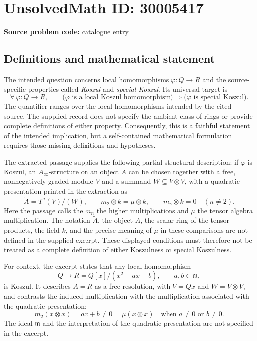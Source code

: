 \documentclass[11pt]{article}
\begin{document}
\section*{UnsolvedMath ID: 30005417}
\textbf{Source problem code:} catalogue entry
\subsection{Definitions and mathematical statement}
The intended question concerns local homomorphisms \(\varphi\colon Q\to R\) and the source-specific properties called \emph{Koszul} and \emph{special Koszul}. Its universal target is
\[
\forall\,\varphi\colon Q\to R,\qquad
\bigl(\varphi\text{ is a local Koszul homomorphism}\bigr)
\Longrightarrow
\bigl(\varphi\text{ is special Koszul}\bigr).
\]
The quantifier ranges over the local homomorphisms intended by the cited source. The supplied record does not specify the ambient class of rings or provide complete definitions of either property. Consequently, this is a faithful statement of the intended implication, but a self-contained mathematical formulation requires those missing definitions and hypotheses.

The extracted passage supplies the following partial structural description: if \(\varphi\) is Koszul, an \(A_\infty\)-structure on an object \(A\) can be chosen together with a free, nonnegatively graded module \(V\) and a summand \(W\subseteq V\otimes V\), with a quadratic presentation printed in the extraction as
\[
\widetilde A=T^a(V)/(W),
\qquad
m_2\otimes k=\mu\otimes k,
\qquad
m_n\otimes k=0\quad(n\ne2).
\]
Here the passage calls the \(m_n\) the higher multiplications and \(\mu\) the tensor algebra multiplication. The notation \(\widetilde A\), the object \(A\), the scalar ring of the tensor products, the field \(k\), and the precise meaning of \(\mu\) in these comparisons are not defined in the supplied excerpt. These displayed conditions must therefore not be treated as a complete definition of either Koszulness or special Koszulness.

For context, the excerpt states that any local homomorphism
\[
Q\longrightarrow R=Q[x]/(x^2-ax-b),\qquad a,b\in\mathfrak m,
\]
is Koszul. It describes \(A=R\) as a free resolution, with \(V=Qx\) and \(W=V\otimes V\), and contrasts the induced multiplication with the multiplication associated with the quadratic presentation:
\[
m_2(x\otimes x)=ax+b\ne0=\mu(x\otimes x)
\quad\text{when }a\ne0\text{ or }b\ne0.
\]
The ideal \(\mathfrak m\) and the interpretation of the quadratic presentation are not specified in the excerpt.
\end{document}
